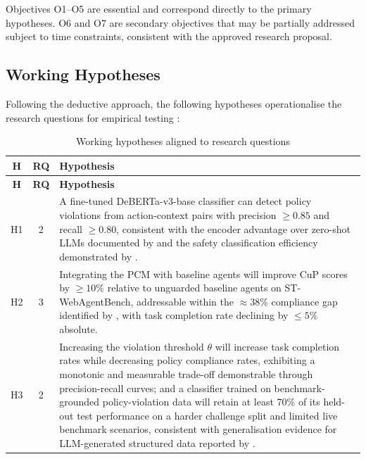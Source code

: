 \documentclass[12pt,a4paper]{article}
\begin{document}
Objectives O1--O5 are essential and correspond directly to the primary hypotheses.
O6 and O7 are secondary objectives that may be partially addressed subject to
time constraints, consistent with the approved research proposal.

\subsection{Working Hypotheses}
\label{sec:hyp}

Following the deductive approach, the following hypotheses operationalise the
research questions for empirical testing \citep{saunders2019research}:

\begin{longtable}[l]{@{} c c p{9cm} @{}}
\caption{Working hypotheses aligned to research questions}\label{tab:hyp}\\
\toprule \textbf{H} & \textbf{RQ} & \textbf{Hypothesis} \\ \midrule
\endfirsthead
\toprule \textbf{H} & \textbf{RQ} & \textbf{Hypothesis} \\ \midrule
\endhead \bottomrule \endfoot
H1 & 2 & A fine-tuned DeBERTa-v3-base classifier can detect policy violations
  from action-context pairs with precision $\geq 0.85$ and recall $\geq 0.80$,
  consistent with the encoder advantage over zero-shot LLMs documented by
  \citet{bucher2024finetuned} and the safety classification efficiency
  demonstrated by \citet{zheng2025lightweight}. \\[4pt]
H2 & 3 & Integrating the PCM with baseline agents will improve CuP scores by
  $\geq 10\%$ relative to unguarded baseline agents on ST-WebAgentBench,
  addressable within the $\approx 38\%$ compliance gap identified by
  \citet{levy2026stwebagentbench}, with task completion rate declining by
  $\leq 5\%$ absolute. \\[4pt]
H3 & 2 & Increasing the violation threshold $\theta$ will increase task
  completion rates while decreasing policy compliance rates, exhibiting a
  monotonic and measurable trade-off demonstrable through precision-recall curves;
  and a classifier trained on benchmark-grounded policy-violation data will
  retain at least 70\% of its held-out test performance on a harder challenge
  split and limited live benchmark scenarios, consistent with generalisation evidence for
  LLM-generated structured data reported by \citet{li2023synthetic}. \\
\end{longtable}
\end{document}
